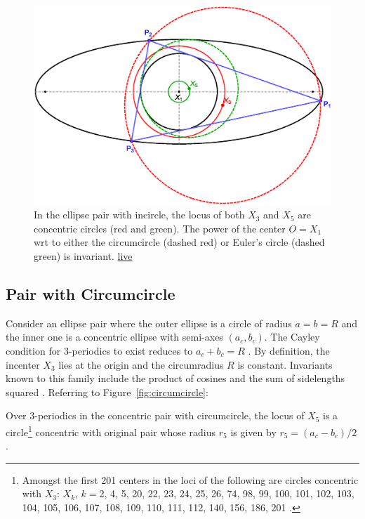 \begin{figure}
    \centering
    \includegraphics[width=.7\textwidth]{pics/0040_n3_incircle.eps}
    \caption{In the ellipse pair with incircle, the locus of both $X_3$ and $X_5$ are concentric circles (red and green). The power of the center $O=X_1$ wrt to either the circumcircle (dashed red) or Euler's circle (dashed green) is invariant. \href{https://bit.ly/3snkrJc}{live}}
    \label{fig:incircle}
\end{figure}

\subsection{Pair with Circumcircle}

Consider an ellipse pair where the outer ellipse is a circle of radius $a=b=R$ and the inner one is a concentric ellipse  with semi-axes $(a_c,b_c)$. The Cayley condition for 3-periodics to exist reduces to $a_c+b_c=R$ \cite{garcia2020-family-ties}. By definition, the incenter $X_3$ lies at the origin and the circumradius $R$ is constant. Invariants known to this family include the product of cosines and the sum of sidelengths squared \cite{garcia2020-family-ties}. Referring to Figure~\ref{fig:circumcircle}:

\begin{proposition}
Over 3-periodics in the concentric pair with circumcircle, the locus of $X_5$ is a circle\footnote{Amongst the first 201 centers in \cite{etc} the loci of the following are circles concentric with $X_3$: $X_k$, $k=$2, 4, 5, 20, 22, 23, 24, 25, 26, 74, 98, 99, 100, 101, 102, 103, 104, 105, 106, 107, 108, 109, 110, 111, 112, 140, 156, 186, 201 \cite{garcia2020-family-ties}.} concentric with original pair whose radius $r_5$ is given by $r_5= ({a_c-b_c})/{2}$. 
\end{proposition}

